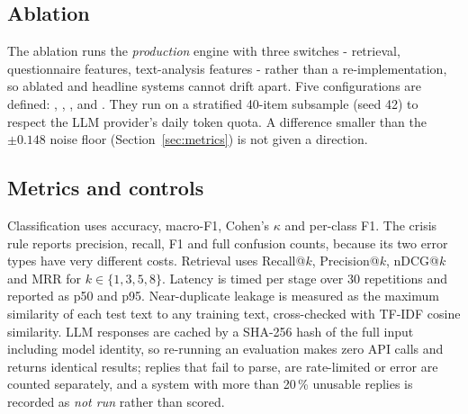 \subsection{Ablation}
The ablation runs the \textit{production} engine with three switches - retrieval, questionnaire features, text-analysis features - rather than a re-implementation, so ablated and headline systems cannot drift apart. Five configurations are defined: , , ,  and . They run on a stratified 40-item subsample (seed 42) to respect the LLM provider's daily token quota. A difference smaller than the $\pm0.148$ noise floor (Section~\ref{sec:metrics}) is not given a direction.

\subsection{Metrics and controls}
Classification uses accuracy, macro-F1, Cohen's $\kappa$ and per-class F1. The crisis rule reports precision, recall, F1 and full confusion counts, because its two error types have very different costs. Retrieval uses Recall@$k$, Precision@$k$, nDCG@$k$ and MRR for $k\in\{1,3,5,8\}$. Latency is timed per stage over 30 repetitions and reported as p50 and p95. Near-duplicate leakage is measured as the maximum  similarity of each test text to any training text, cross-checked with TF-IDF cosine similarity. LLM responses are cached by a SHA-256 hash of the full input including model identity, so re-running an evaluation makes zero API calls and returns identical results; replies that fail to parse, are rate-limited or error are counted separately, and a system with more than 20\,\% unusable replies is recorded as \textit{not run} rather than scored.
